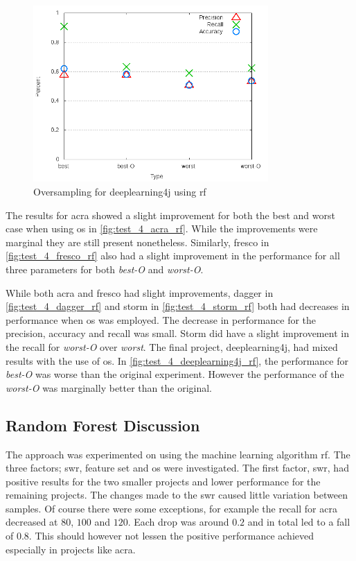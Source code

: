 \begin{figure}[!ht]
    \centering
        \includegraphics[width=0.8\textwidth]{images/rf/test_4/deeplearning4j_sample_range}
    \caption{Oversampling for deeplearning4j using \gls{rf}}
    \label{fig:test_4_deeplearning4j_rf}
\end{figure}

The results for acra showed a slight improvement for both the best and worst case when using \gls{os} in \autoref{fig:test_4_acra_rf}. While the improvements were marginal they are still present nonetheless. Similarly, fresco in \autoref{fig:test_4_fresco_rf} also had a slight improvement in the performance for all three parameters for both \textit{best-O} and \textit{worst-O}.

While both acra and fresco had slight improvements, dagger in \autoref{fig:test_4_dagger_rf} and storm in \autoref{fig:test_4_storm_rf} both had decreases in performance when \gls{os} was employed. The decrease in performance for the precision, accuracy and recall was small. Storm did have a slight improvement in the recall for \textit{worst-O} over \textit{worst}. The final project, deeplearning4j, had mixed results with the use of \gls{os}. In \autoref{fig:test_4_deeplearning4j_rf}, the performance for \textit{best-O} was worse than the original experiment. However the performance of the \textit{worst-O} was marginally better than the original.

\subsection{Random Forest Discussion}
\label{subsec:rf_discussion}

The approach was experimented on using the machine learning algorithm \gls{rf}. The three factors; \gls{swr}, feature set and \gls{os} were investigated. The first factor, \gls{swr}, had positive results for the two smaller projects and lower performance for the remaining projects. The changes made to the \gls{swr} caused little variation between samples. Of course there were some exceptions, for example the recall for acra decreased at $80$, $100$ and $120$. Each drop was around $0.2$ and in total led to a fall of $0.8$. This should however not lessen the positive performance achieved especially in projects like acra.

